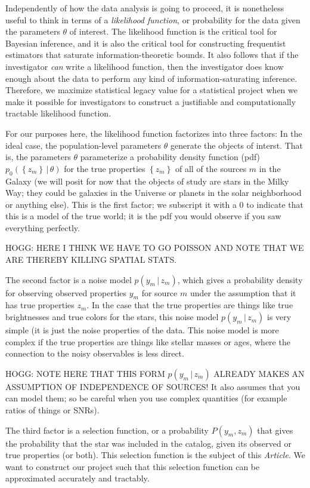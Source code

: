 \documentclass[modern]{aastex62}
\newcommand{\given}{\,|\,}
\newcommand{\set}[1]{\left\{{#1}\right\}}
\newcommand{\documentname}{\textsl{Article}}
\begin{document}
Independently of how the data analysis is going to proceed, it is nonetheless
useful to think in
terms of a \emph{likelihood function}, or probability for the data given
the parameters $\theta$ of interest.
The likelihood function is the critical tool for Bayesian inference, and
it is also the critical tool for constructing frequentist estimators that
saturate information-theoretic bounds.
It also follows that if the investigator \emph{can} write a likelihood
function, then the investigator does know enough about the data to perform
any kind of information-saturating inference.
Therefore, we maximize statistical legacy value for a statistical project
when we make it possible for investigators to construct a justifiable and
computationally tractable likelihood function.

For our purposes here, the likelihood function factorizes into three
factors:
In the ideal case, the population-level parameters $\theta$ generate the
objects of interst.
That is, the parameters $\theta$ parameterize a probability density
function (pdf) $p_0(\set{z_m}\given\theta)$
for the true properties $\set{z_m}$ of all of the sources $m$
in the Galaxy (we will posit for now that the objects of study are
stars in the Milky Way; they could be galaxies in the Universe or
planets in the solar neighborhood or anything else).
This is the first factor; we subscript it with a $0$ to indicate that
this is a model of the true world;
it is the pdf you would observe if you saw everything perfectly.

HOGG: HERE I THINK WE HAVE TO GO POISSON AND NOTE THAT WE ARE THEREBY KILLING SPATIAL STATS.

The second factor is
a noise model $p(y_m\given z_m)$, which gives a probability density for
observing observed properties $y_m$ for source $m$ under the assumption
that it has true properties $z_m$.
In the case that the true properties are things like true brightnesses
and true colors for the stars, this noise model $p(y_m\given z_m)$ is
very simple (it is just the noise properties of the data.
This noise model is more complex if the true properties are things like
stellar masses or ages, where the connection to the noisy observables is
less direct.

HOGG: NOTE HERE THAT THIS FORM $p(y_m\given z_m)$ ALREADY MAKES AN
ASSUMPTION OF INDEPENDENCE OF SOURCES! It also assumes that you can
model them; so be careful when you use complex quantities (for example
ratios of things or SNRs).

The third factor is a selection function, or a probability $P(y_m,
z_m)$ that gives the probability that the star was included in the
catalog, given its observed or true properties (or both).
This selection function is the subject of this \documentname.
We want to construct our project such that this selection function can
be approximated accurately and tractably.
\end{document}
